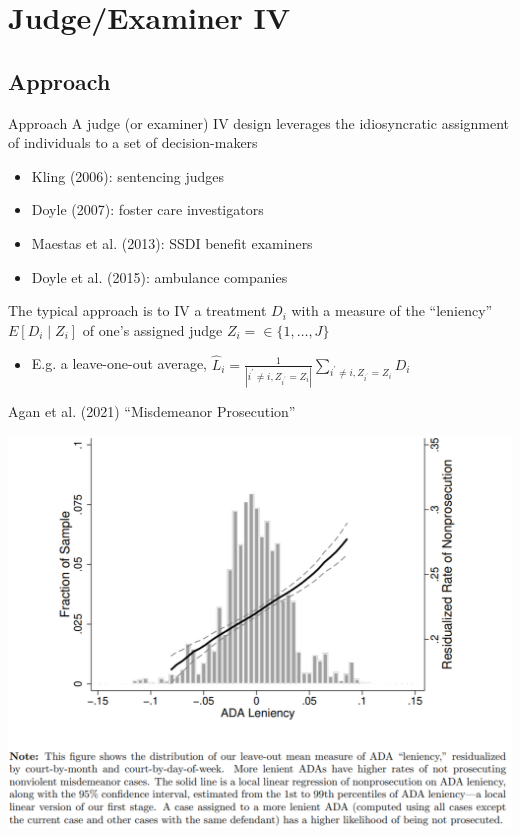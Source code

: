 \documentclass{beamer}
\begin{document}

\section{Judge/Examiner IV}

\subsection{Approach}
\begin{frame}{Approach}
\vspace{-0.2cm}
A judge (or examiner) IV design leverages the idiosyncratic assignment of individuals to a set of decision-makers\smallskip
\begin{itemize}
\item Kling (2006): sentencing judges\smallskip
\item Doyle (2007): foster care investigators\smallskip
\item Maestas et al. (2013): SSDI benefit examiners\smallskip
\item Doyle et al. (2015): ambulance companies
\end{itemize}\bigskip\pause{}
The typical approach is to IV a treatment $D_i$ with a measure of the ``leniency'' $E[D_i\mid Z_{i}]$ of one's assigned judge $Z_i=\in\{1,\dots,J\}$\smallskip
\begin{itemize}
\item E.g. a leave-one-out average, $\hat{L}_i=\frac{1}{|i^\prime\neq i,Z_{i^\prime}=Z_i|}\sum_{i^\prime \neq i,Z_{i^\prime}=Z_i}D_i$
\end{itemize}
\end{frame}

\begin{frame}{Agan et al. (2021) ``Misdemeanor Prosecution''}
\begin{center}
\includegraphics[scale=0.55]{./lecture_includes/agan_FS.png}
\end{center}
\end{frame}
\end{document}
